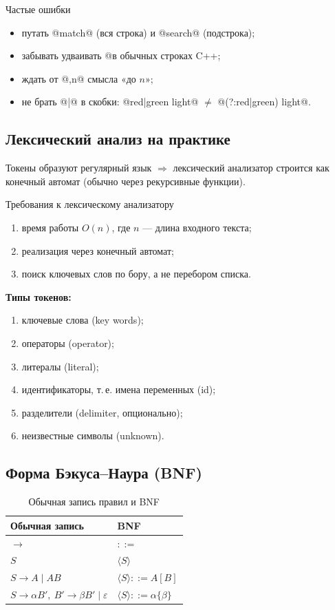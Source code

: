 \documentclass[11pt,a4paper]{article}
\newcommand{\rul}{\rightarrow}
\begin{document}
\begin{kob}{Частые ошибки}
\begin{itemize}
\item путать @match@ (вся строка) и @search@ (подстрока);
\item забывать удваивать @\@ в обычных строках C++;
\item ждать от @{,n}@ смысла «до $n$»;
\item не брать @|@ в скобки: @red|green light@ $\ne$ @(?:red|green) light@.
\end{itemize}
\end{kob}

\subsection{Лексический анализ на практике}

Токены образуют регулярный язык $\Rightarrow$ лексический анализатор строится как конечный автомат (обычно через рекурсивные функции).

\begin{kvb}{Требования к лексическому анализатору}
\begin{enumerate}
\item время работы $O(n)$, где $n$ — длина входного текста;
\item реализация через конечный автомат;
\item поиск ключевых слов по бору, а не перебором списка.
\end{enumerate}
\end{kvb}

\textbf{Типы токенов:}
\begin{enumerate}
\item ключевые слова (key words);
\item операторы (operator);
\item литералы (literal);
\item идентификаторы, т.\,е. имена переменных (id);
\item разделители (delimiter, опционально);
\item неизвестные символы (unknown).
\end{enumerate}

\subsection{Форма Бэкуса–Наура (BNF)}

\begin{table}[H]
\centering
\renewcommand{\arraystretch}{1.35}
\begin{tabular}{ll}
\toprule
{\hfont\color{kviolet}Обычная запись} & {\hfont\color{kviolet}BNF}\\
\midrule
$\rul$ & $::=$\\
$S$ & $\langle S\rangle$\\
$S\rul A\mid AB$ & $\langle S\rangle::=A[B]$\\
$S\rul\alpha B',\ B'\rul\beta B'\mid\varepsilon$ & $\langle S\rangle::=\alpha\{\beta\}$\\
\bottomrule
\end{tabular}
\caption{Обычная запись правил и BNF}
\end{table}
\end{document}
